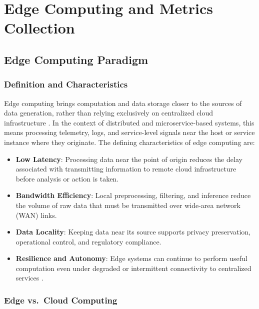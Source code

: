 \chapter{Edge Computing and Metrics Collection}
\label{ch:edge_computing}

\section{Edge Computing Paradigm}
\label{sec:edge_paradigm}

\subsection{Definition and Characteristics}
\label{subsec:edge_definition}

Edge computing brings computation and data storage closer to the sources of data
generation, rather than relying exclusively on centralized cloud infrastructure
\cite{shi2016edge, satyanarayanan2017emergence, varghese2016challenges, mao2017survey}.
In the context of distributed and microservice-based systems, this means processing
telemetry, logs, and service-level signals near the host or service instance where
they originate. The defining characteristics of edge computing are:

\begin{itemize}
    \item \textbf{Low Latency}: Processing data near the point of origin reduces the
    delay associated with transmitting information to remote cloud infrastructure before
    analysis or action is taken.

    \item \textbf{Bandwidth Efficiency}: Local preprocessing, filtering, and inference
    reduce the volume of raw data that must be transmitted over wide-area network (WAN)
    links.

    \item \textbf{Data Locality}: Keeping data near its source supports privacy
    preservation, operational control, and regulatory compliance.

    \item \textbf{Resilience and Autonomy}: Edge systems can continue to perform useful
    computation even under degraded or intermittent connectivity to centralized services
    \cite{satyanarayanan2017emergence}.
\end{itemize}

\subsection{Edge vs.\ Cloud Computing}
\label{subsec:edge_vs_cloud}

